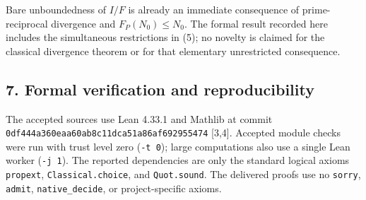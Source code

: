 \documentclass[
  11pt,
]{article}
\begin{document}
Bare unboundedness of \(I/F\) is already an immediate consequence of
prime-reciprocal divergence and \(F_P(N_0)\le N_0\). The formal result
recorded here includes the simultaneous restrictions in (5); no novelty
is claimed for the classical divergence theorem or for that elementary
unrestricted consequence.

\hypertarget{formal-verification-and-reproducibility}{%
\subsection{7. Formal verification and
reproducibility}\label{formal-verification-and-reproducibility}}

The accepted sources use Lean 4.33.1 and Mathlib at commit
\texttt{0df444a360\allowbreak{}eaa60ab8c1\allowbreak{}1dca51a86a\allowbreak{}f692955474} {[}3,4{]}. Accepted
module checks were run with trust level zero (\texttt{-t\ 0}); large
computations also use a single Lean worker (\texttt{-j\ 1}). The
reported dependencies are only the standard logical axioms
\texttt{propext}, \texttt{Classical.\allowbreak{}choice}, and \texttt{Quot.\allowbreak{}sound}.
The delivered proofs use no \texttt{sorry}, \texttt{admit},
\texttt{native\_\allowbreak{}decide}, or project-specific axioms.
\end{document}
